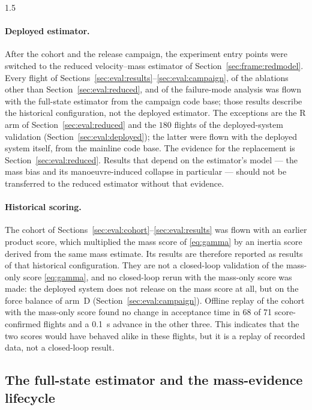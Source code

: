 \begin{spacing}{1.5}
\paragraph{Deployed estimator.} After the cohort and the release campaign, the
experiment entry points were switched to the reduced velocity--mass estimator of
Section~\ref{sec:frame:redmodel}. Every flight of
Sections~\ref{sec:eval:results}--\ref{sec:eval:campaign}, of the ablations other
than Section~\ref{sec:eval:reduced}, and of the failure-mode analysis was flown
with the full-state estimator from the campaign code base; those results
describe the historical configuration, not the deployed estimator. The
exceptions are the R arm of Section~\ref{sec:eval:reduced} and the $180$ flights
of the deployed-system validation (Section~\ref{sec:eval:deployed}); the latter
were flown with the deployed system itself, from the mainline code base. The
evidence for the replacement is Section~\ref{sec:eval:reduced}. Results that depend on the estimator's model ---
the mass bias and its manoeuvre-induced collapse in particular --- should not be
transferred to the reduced estimator without that evidence.

\paragraph{Historical scoring.}
The cohort of Sections~\ref{sec:eval:cohort}--\ref{sec:eval:results} was flown
with an earlier product score, which multiplied the mass score of
\eqref{eq:gamma} by an inertia score derived from the same mass estimate. Its
results are therefore reported as results of that historical configuration.
They are not a closed-loop validation of the mass-only score \eqref{eq:gamma},
and no closed-loop rerun with the mass-only score was made: the deployed system
does not release on the mass score at all, but on the force balance of arm~D
(Section~\ref{sec:eval:campaign}). Offline replay of the cohort with the
mass-only score found no change in acceptance time in 68 of 71 score-confirmed
flights and a \SI{0.1}{\second} advance in the other three. This indicates that
the two scores would have behaved alike in these flights, but it is a replay of
recorded data, not a closed-loop result.

\subsection{The full-state estimator and the mass-evidence lifecycle}\label{sec:model:mhe}


\end{spacing}
